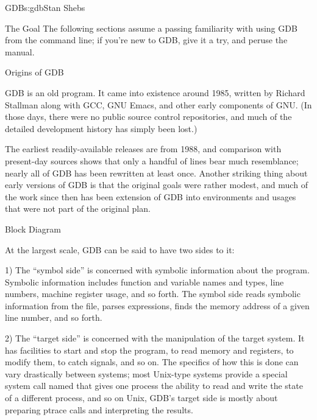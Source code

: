\begin{aosachapter}{GDB}{s:gdb}{Stan Shebs}
\begin{aosasect1}{The Goal}
The following sections assume a passing familiarity with using GDB
from the command line; if you're new to GDB, give it a try, and peruse
the manual.

\end{aosasect1}

\begin{aosasect1}{Origins of GDB}

GDB is an old program.  It came into existence around 1985, written
by Richard Stallman along with GCC, GNU Emacs, and other early
components of GNU.  (In those days, there were no public source
control repositories, and much of the detailed development history
has simply been lost.)

The earliest readily-available releases are from 1988, and comparison
with present-day sources shows that only a handful of lines bear much
resemblance; nearly all of GDB has been rewritten at least once.
Another striking thing about early versions of GDB is that the
original goals were rather modest, and much of the work since then has
been extension of GDB into environments and usages that were not part
of the original plan.

\end{aosasect1}

\begin{aosasect1}{Block Diagram}


At the largest scale, GDB can be said to have two sides to it:

1) The ``symbol side'' is concerned with symbolic information about
the program.  Symbolic information includes function and variable
names and types, line numbers, machine register usage, and so forth.
The symbol side reads symbolic information from the file, parses
expressions, finds the memory address of a given line number, and so
forth.

2) The ``target side'' is concerned with the manipulation of the
target system.  It has facilities to start and stop the program, to
read memory and registers, to modify them, to catch signals, and so
on.  The specifics of how this is done can vary drastically between
systems; most Unix-type systems provide a special system call named
 that gives one process the ability to read and write the
state of a different process, and so on Unix, GDB's target side is
mostly about preparing ptrace calls and interpreting the results.


\end{aosasect1}
\end{aosachapter}
